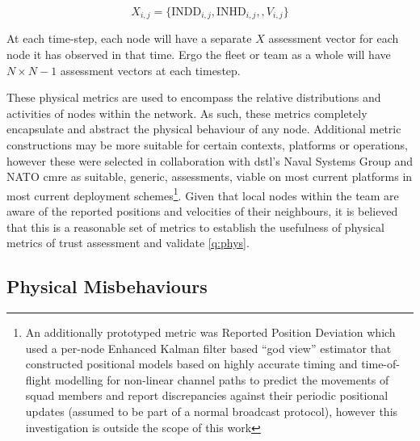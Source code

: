 \begin{equation}
X_{i,j}=\{\text{INDD}_{i,j}, \text{INHD}_{i,j},, V_{i,j}\}
\label{eq:phys_vector}
\end{equation}

At each time-step, each node will have a separate $X$ assessment vector for each node it has observed in that time. 
Ergo the fleet or team as a whole will have $N\times N-1$ assessment vectors at each timestep.

These physical metrics are used to encompass the relative distributions and activities of nodes within the network. 
As such, these metrics completely encapsulate and abstract the physical behaviour of any node.
Additional metric constructions may be more suitable for certain contexts, platforms or operations, however these were selected in collaboration with \gls{dstl}'s Naval Systems Group and NATO \gls{cmre} as suitable, generic, assessments, viable on most current platforms in most current deployment schemes\footnote{An additionally prototyped metric was Reported Position Deviation which used a per-node Enhanced Kalman filter based ``god view'' estimator that constructed positional models based on highly accurate timing and time-of-flight modelling for non-linear channel paths to predict the movements of squad members and report discrepancies against their periodic positional updates (assumed to be part of a normal broadcast protocol), however this investigation is outside the scope of this work}.
Given that local nodes within the team are aware of the reported positions and velocities of their neighbours, it is believed that this is a reasonable set of metrics to establish the usefulness of physical metrics of trust assessment and validate \autoref{q:phys}.


\subsection{Physical Misbehaviours}\label{sec:physical-misbehaviours}

